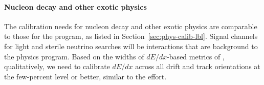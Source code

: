 \paragraph{Nucleon decay and other exotic physics}
The calibration needs for nucleon decay and other exotic physics are comparable to those for the  program, as listed in Section~\ref{sec:phys-calib-lbl}. Signal channels for light  and sterile neutrino searches will be  interactions that are background to the  physics program. 
Based on the widths of $dE/dx$-based metrics of , qualitatively, we need to calibrate $dE/dx$ across all drift and track orientations at the few-percent level or better, similar to the  effort.




